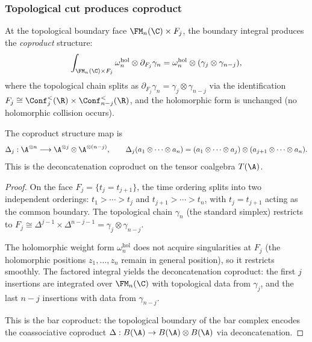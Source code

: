 \subsubsection{Topological cut produces coproduct}

\begin{proposition}
At the topological boundary face
$\FM_n(\C) \times F_j$, the boundary integral produces
the \emph{coproduct} structure:
\begin{equation}%
\int_{\FM_n(\C) \times F_j}
\omega_n^{\mathrm{hol}} \otimes \partial_{F_j}\gamma_n
= \omega_n^{\mathrm{hol}}
\otimes (\gamma_j \otimes \gamma_{n-j}),
\end{equation}
where the topological chain splits as
$\partial_{F_j}\gamma_n = \gamma_j \otimes \gamma_{n-j}$
via the identification $F_j \cong \Conf_j^<(\R) \times
\Conf_{n-j}^<(\R)$, and the holomorphic form is
unchanged (no holomorphic collision occurs).

The coproduct structure map is
\begin{equation}%
\Delta_j : \A^{\otimes n} \longrightarrow
\A^{\otimes j} \otimes \A^{\otimes(n-j)},
\qquad
\Delta_j(a_1 \otimes \cdots \otimes a_n)
= (a_1 \otimes \cdots \otimes a_j)
\otimes (a_{j+1} \otimes \cdots \otimes a_n).
\end{equation}
This is the deconcatenation coproduct on the tensor
coalgebra $T(\A)$.
\end{proposition}

\begin{proof}
On the face $F_j = \{t_j = t_{j+1}\}$, the time
ordering splits into two independent orderings:
$t_1 > \cdots > t_j$ and
$t_{j+1} > \cdots > t_n$, with $t_j = t_{j+1}$
acting as the common boundary. The topological chain
$\gamma_n$ (the standard simplex) restricts to
$F_j \cong \Delta^{j-1} \times \Delta^{n-j-1}
= \gamma_j \otimes \gamma_{n-j}$.

The holomorphic weight form $\omega_n^{\mathrm{hol}}$
does not acquire singularities at $F_j$ (the
holomorphic positions $z_1, \ldots, z_n$ remain
in general position), so it restricts smoothly.
The factored integral yields the deconcatenation
coproduct: the first $j$ insertions are integrated
over $\FM_n(\C)$ with topological data from
$\gamma_j$, and the last $n-j$ insertions with data
from $\gamma_{n-j}$.

This is the bar coproduct: the topological
boundary of the bar complex encodes the coassociative
coproduct $\Delta : B(\A) \to B(\A) \otimes B(\A)$
via deconcatenation.
\end{proof}

